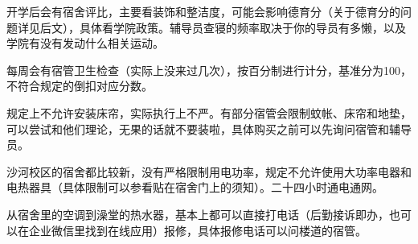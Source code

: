 
开学后会有宿舍评比，主要看装饰和整洁度，可能会影响德育分（关于德育分的问题详见后文），具体看学院政策。辅导员查寝的频率取决于你的导员有多懒，以及学院有没有发动什么相关运动。

每周会有宿管卫生检查（实际上没来过几次），按百分制进行计分，基准分为100，不符合规定的倒扣对应分数。


规定上不允许安装床帘，实际执行上不严。有部分宿管会限制蚊帐、床帘和地垫，可以尝试和他们理论，无果的话就不要装啦，具体购买之前可以先询问宿管和辅导员。


沙河校区的宿舍都比较新，没有严格限制用电功率，规定不允许使用大功率电器和电热器具（具体限制可以参看贴在宿舍门上的须知）。二十四小时通电通网。


从宿舍里的空调到澡堂的热水器，基本上都可以直接打电话（后勤接诉即办，也可以在企业微信里找到在线应用）报修，具体报修电话可以问楼道的宿管。

